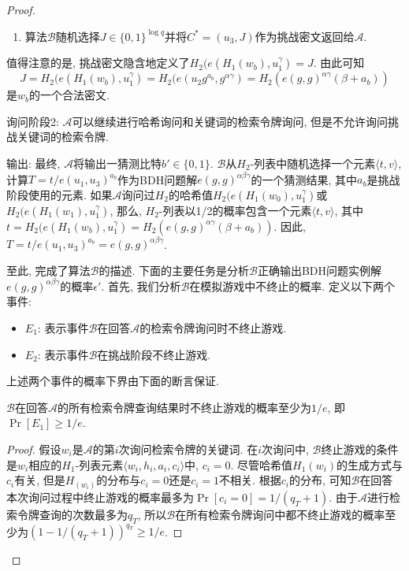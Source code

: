 \begin{proof}
\begin{trivlist}
\begin{enumerate}
\item 算法$\mathcal{B}$随机选择$J \in \{0, 1\}^{\log q}$并将$C^* = (u_3, J)$作为挑战密文返回给$\mathcal{A}$.
\end{enumerate}
值得注意的是, 挑战密文隐含地定义了$H_2(e(H_1(w_b), u_1^\gamma) = J$. 由此可知
\[
J = H_2(e(H_1(w_b), u_1^\gamma) = H_2(e(u_2g^{a_b}, g^{\alpha\gamma}) = H_2(e(g, g)^{\alpha\gamma}(\beta + a_b))
\]
是$w_b$的一个合法密文.

\item 询问阶段2: $\mathcal{A}$可以继续进行哈希询问和关键词的检索令牌询问, 但是不允许询问挑战关键词的检索令牌.

\item 输出: 最终, $\mathcal{A}$将输出一猜测比特$b' \in \{0, 1\}$. $\mathcal{B}$从$H_2$-列表中随机选择一个元素$\langle t, v\rangle$, 计算$T = t/e(u_1, u_3)^{a_b}$作为BDH问题解$e(g, g)^{\alpha\beta\gamma}$的一个猜测结果, 其中$a_b$是挑战阶段使用的元素. 如果$\mathcal{A}$询问过$H_2$的哈希值$ H_2(e(H_1(w_0), u_1^\gamma)$或$H_2(e(H_1(w_1), u_1^\gamma)$, 那么, $H_2$-列表以1/2的概率包含一个元素$\langle t, v\rangle$, 其中$t = H_2(e(H_1(w_b), u_1^\gamma) = H_2(e(g, g)^{\alpha\gamma}(\beta + a_b))$. 因此, $T = t/e(u_1, u_3)^{a_b} = e(g, g)^{\alpha\beta\gamma}$.
\end{trivlist}

至此, 完成了算法$\mathcal{B}$的描述. 下面的主要任务是分析$\mathcal{B}$正确输出BDH问题实例解$e(g, g)^{\alpha\beta\gamma}$的概率$\epsilon'$. 首先, 我们分析$\mathcal{B}$在模拟游戏中不终止的概率. 定义以下两个事件: 
\begin{itemize}
\item $E_1$: 表示事件$\mathcal{B}$在回答$\mathcal{A}$的检索令牌询问时不终止游戏.

\item $E_2$: 表示事件$\mathcal{B}$在挑战阶段不终止游戏.
\end{itemize}
上述两个事件的概率下界由下面的断言保证.
\begin{claim}\label{claim:ch6-E1}
$\mathcal{B}$在回答$\mathcal{A}$的所有检索令牌查询结果时不终止游戏的概率至少为$1/e$, 即$\Pr[E_1] \geq 1/e$. 
\end{claim}
\begin{proof}
假设$w_i$是$\mathcal{A}$的第$i$次询问检索令牌的关键词. 在$i$次询问中, $\mathcal{B}$终止游戏的条件是$w_i$相应的$H_1$-列表元素$\langle w_i, h_i, a_i, c_i\rangle$中, $c_i = 0$. 尽管哈希值$H_1(w_i)$的生成方式与$c_i$有关, 但是$H_(w_i)$的分布与$c_i = 0$还是$c_i = 1$不相关. 根据$c_i$的分布, 可知$\mathcal{B}$在回答本次询问过程中终止游戏的概率最多为$\Pr[c_i = 0] = 1/(q_T + 1)$. 由于$\mathcal{A}$进行检索令牌查询的次数最多为$q_T$, 所以$\mathcal{B}$在所有检索令牌询问中都不终止游戏的概率至少为$(1-1/(q_T + 1))^{q_T} \geq 1/e$. 


\end{proof}
\end{proof}
